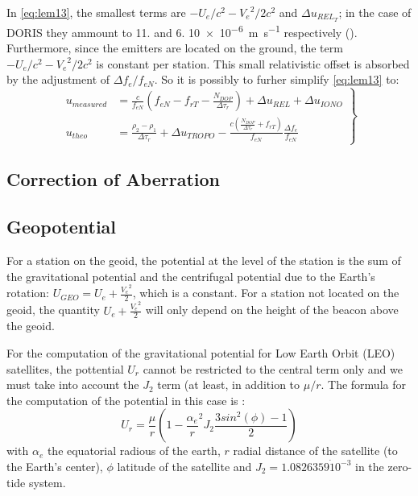 In \ref{eq:lem13}, the smallest terms are \(-U_e / c^2 - {V_e}^2 / 2 c^2\) and 
\(\Delta u_{{REL}_T}\); in the case of DORIS they ammount to \num{11.} and \num{6.} \SI{10e-6}{\meter\per\second} 
respectively (\cite{lemoine-2016}). Furthermore, since the emitters are located on the 
ground, the term \(-U_e / c^2 - {V_e}^2 / 2 c^2\) is constant per station. This small 
relativistic offset is absorbed by the adjustment of \(\Delta f_e / f_{eN}\). So it is 
possibly to furher simplify \ref{eq:lem13} to:
\begin{equation}
    \label{eq:lem17}
    \left.\begin{aligned}
        u_{measured} & = \frac{c}{f_{eN}} (f_{eN} - f_{rT} -
         \frac{N_{DOP}}{\Delta\tau_r}) + \Delta u_{REL} + \Delta u_{IONO}\\
        u_{theo} &= \frac{\rho_2 - \rho_1}{\Delta\tau_r} + \Delta u_{TROPO} - \frac{c(\frac{N_{DOP}}{\Delta\tau_r} + f_{rT})}{f_{eN}} \frac{\Delta f_e}{f_{eN}}
    \end{aligned}
\right\}
\end{equation}

\subsection{Correction of Aberration}

\subsection{Geopotential}
For a station on the geoid, the potential at the level of the station is the sum 
of the gravitational potential and the centrifugal potential due to the Earth's 
rotation: \(U_{GEO} = U_e + \frac{{V_e}^2}{2}\), which is a constant. For a station 
not located on the geoid, the quantity \(U_e + \frac{{V_e}^2}{2}\) will only depend 
on the height of the beacon above the geoid.

For the computation of the gravitational potential for Low Earth Orbit (LEO) satellites, 
the pottential \(U_r\) cannot be restricted to the central term only and we must 
take into account the \(J_2\) term (at least, in addition to \(\mu / r\). The formula 
for the computation of the potential in this case is \cite{lemoine-2016}:
\begin{equation}
    U_r = \frac{\mu}{r} (1-{\frac{\alpha_e}{r}}^2 J_2 \frac{3 sin^2(\phi) - 1}{2})
\end{equation}
with \(\alpha_e\) the equatorial radious of the earth, \(r\) radial distance of the 
satellite (to the Earth's center), \(\phi\) latitude of the satellite and \(J_2 = 1.0826359 \dot 10^{-3}\) 
in the zero-tide system.

